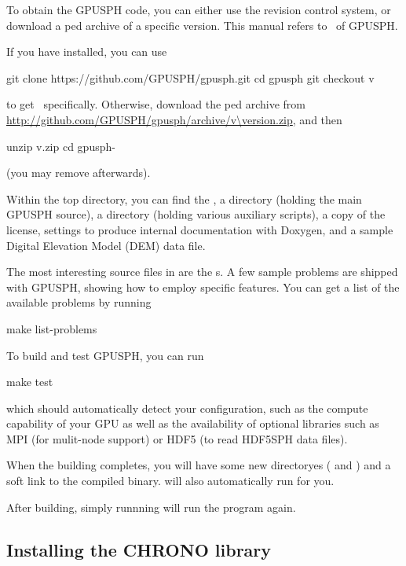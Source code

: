 \documentclass{../GPUSPHtemplate}
\begin{document}
To obtain the GPUSPH code, you can either use the  revision
control system, or download a ped archive of a specific
version. This manual refers to \currentver\ of GPUSPH.

If you have  installed, you can use
\begin{shellcode}[escapeinside=\{\}]
git clone https://github.com/GPUSPH/gpusph.git
cd gpusph
git checkout v{\version}
\end{shellcode}
to get \currentver\ specifically. Otherwise, download the ped
archive from \url{http://github.com/GPUSPH/gpusph/archive/v\version.zip},
and then
\begin{shellcode}[escapeinside=\{\}]
unzip v{\version}.zip
cd gpusph-{\version}
\end{shellcode}
(you may remove \version{} afterwards).

Within the top directory, you can find the , a 
directory (holding the main GPUSPH source), a  directory
(holding various auxiliary scripts), a copy of the license, settings to
produce internal documentation with Doxygen, and a sample Digital
Elevation Model (DEM) data file.

The most interesting source files in  are the s.
A few sample problems are shipped with GPUSPH, showing how to employ
specific features. You can get a list of the available problems by
running
\begin{shellcode}
make list-problems
\end{shellcode}

To build and test GPUSPH, you can run
\begin{shellcode}
make test
\end{shellcode}
which should automatically detect your configuration, such as the
compute capability of your GPU as well as the availability of optional
libraries such as MPI (for mulit-node support) or HDF5 (to read HDF5SPH
data files).

When the building completes, you will have some new directoryes
( and ) and a  soft link to the
compiled binary.  will also automatically run
 for you.

After building, simply runnning  will run the program
again.

\subsection{Installing the CHRONO library}
\end{document}
